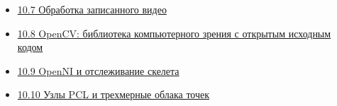 \begin{itemize}
\item { \href{10.7-obrabotka-zapisannogo-video.md}{10.7 Обработка записанного видео}} 
\item { \href{10.8-opencv-biblioteka-kompyuternogo-zreniya-s-otkrytym-iskhodnym-kodom.md}{10.8 OpenCV: библиотека компьютерного зрения с открытым исходным кодом}} 
\item { \href{10.9-openni-i-otslezhivanie-skeleta.md}{10.9 OpenNI и отслеживание скелета}} 
\item { \href{10.10-uzly-pcl-i-trekhmernye-oblaka-tochek.md}{10.10 Узлы PCL и трехмерные облака точек}} 
\end{itemize} 

